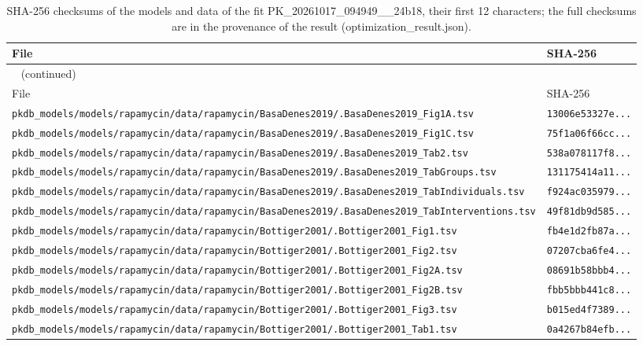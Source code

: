 \documentclass{article}
\begin{document}
\begin{longtable}{ll}
\caption{SHA-256 checksums of the models and data of the fit PK\_20261017\_094949\_\_24b18, their first 12 characters; the full checksums are in the provenance of the result (optimization\_result.json).}\label{tab:checksums:PK_20261017_094949__24b18} \\
\toprule
File & SHA-256 \\
\midrule
\endfirsthead
\multicolumn{2}{l}{\small\tablename~\thetable{} (continued)} \\
\toprule
File & SHA-256 \\
\midrule
\endhead
\bottomrule
\endlastfoot
\texttt{pkdb\_models/models/rapamycin/data/rapamycin/BasaDenes2019/.BasaDenes2019\_Fig1A.tsv} & \texttt{13006e53327e...} \\
\texttt{pkdb\_models/models/rapamycin/data/rapamycin/BasaDenes2019/.BasaDenes2019\_Fig1C.tsv} & \texttt{75f1a06f66cc...} \\
\texttt{pkdb\_models/models/rapamycin/data/rapamycin/BasaDenes2019/.BasaDenes2019\_Tab2.tsv} & \texttt{538a078117f8...} \\
\texttt{pkdb\_models/models/rapamycin/data/rapamycin/BasaDenes2019/.BasaDenes2019\_TabGroups.tsv} & \texttt{131175414a11...} \\
\texttt{pkdb\_models/models/rapamycin/data/rapamycin/BasaDenes2019/.BasaDenes2019\_TabIndividuals.tsv} & \texttt{f924ac035979...} \\
\texttt{pkdb\_models/models/rapamycin/data/rapamycin/BasaDenes2019/.BasaDenes2019\_TabInterventions.tsv} & \texttt{49f81db9d585...} \\
\texttt{pkdb\_models/models/rapamycin/data/rapamycin/Bottiger2001/.Bottiger2001\_Fig1.tsv} & \texttt{fb4e1d2fb87a...} \\
\texttt{pkdb\_models/models/rapamycin/data/rapamycin/Bottiger2001/.Bottiger2001\_Fig2.tsv} & \texttt{07207cba6fe4...} \\
\texttt{pkdb\_models/models/rapamycin/data/rapamycin/Bottiger2001/.Bottiger2001\_Fig2A.tsv} & \texttt{08691b58bbb4...} \\
\texttt{pkdb\_models/models/rapamycin/data/rapamycin/Bottiger2001/.Bottiger2001\_Fig2B.tsv} & \texttt{fbb5bbb441c8...} \\
\texttt{pkdb\_models/models/rapamycin/data/rapamycin/Bottiger2001/.Bottiger2001\_Fig3.tsv} & \texttt{b015ed4f7389...} \\
\texttt{pkdb\_models/models/rapamycin/data/rapamycin/Bottiger2001/.Bottiger2001\_Tab1.tsv} & \texttt{0a4267b84efb...} \\

\end{longtable}
\end{document}
